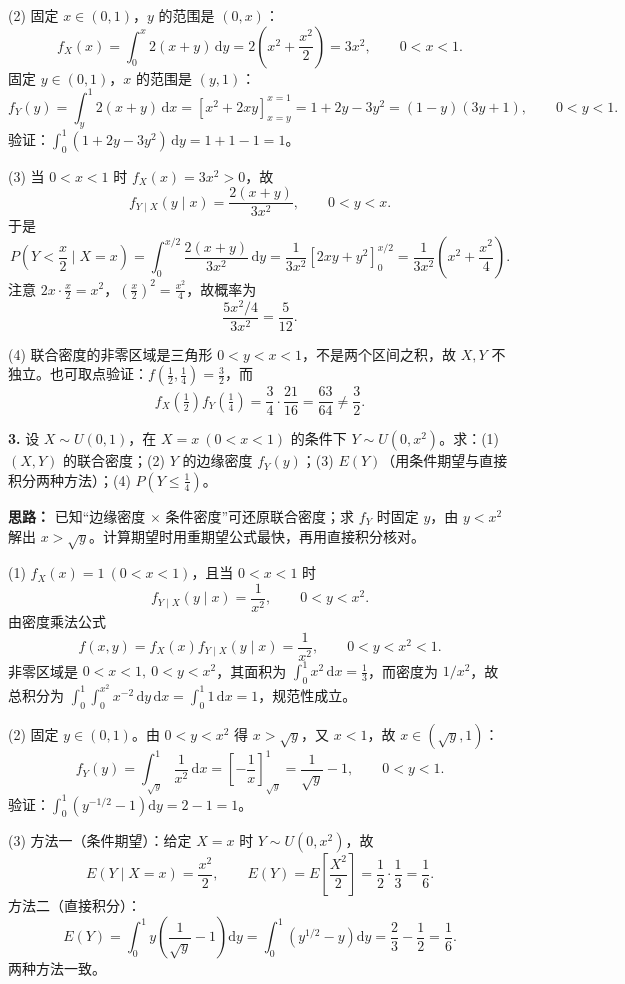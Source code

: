 (2) 固定 $x\in(0,1)$，$y$ 的范围是 $(0,x)$：
\[
f_X(x)=\int_0^x 2(x+y)\,\mathrm dy
=2\left(x^2+\frac{x^2}{2}\right)=3x^2,\qquad 0<x<1.
\]
固定 $y\in(0,1)$，$x$ 的范围是 $(y,1)$：
\[
f_Y(y)=\int_y^1 2(x+y)\,\mathrm dx
=\left[x^2+2xy\right]_{x=y}^{x=1}
=1+2y-3y^2=(1-y)(3y+1),\qquad 0<y<1.
\]
验证：$\int_0^1(1+2y-3y^2)\,\mathrm dy=1+1-1=1$。

(3) 当 $0<x<1$ 时 $f_X(x)=3x^2>0$，故
\[
f_{Y\mid X}(y\mid x)=\frac{2(x+y)}{3x^2},\qquad 0<y<x.
\]
于是
\[
P\!\left(Y<\frac{x}{2}\mid X=x\right)
=\int_0^{x/2}\frac{2(x+y)}{3x^2}\,\mathrm dy
=\frac{1}{3x^2}\left[2xy+y^2\right]_0^{x/2}
=\frac{1}{3x^2}\left(x^2+\frac{x^2}{4}\right).
\]
注意 $2x\cdot\frac{x}{2}=x^2$，$\left(\frac{x}{2}\right)^2=\frac{x^2}{4}$，故概率为
\[
\frac{5x^2/4}{3x^2}=\frac{5}{12}.
\]

(4) 联合密度的非零区域是三角形 $0<y<x<1$，不是两个区间之积，故 $X,Y$ 不独立。也可取点验证：$f(\tfrac12,\tfrac14)=\tfrac32$，而
\[
f_X(\tfrac12)f_Y(\tfrac14)=\frac34\cdot\frac{21}{16}=\frac{63}{64}\neq\frac32.
\]


\else \answerarea[10] \fi%
\textbf{3.} 设 $X\sim U(0,1)$，在 $X=x\ (0<x<1)$ 的条件下 $Y\sim U(0,x^2)$。求：(1) $(X,Y)$ 的联合密度；(2) $Y$ 的边缘密度 $f_Y(y)$；(3) $E(Y)$（用条件期望与直接积分两种方法）；(4) $P(Y\leq \tfrac14)$。

\ifshowsolutions%
\textbf{思路：} 已知“边缘密度 $\times$ 条件密度”可还原联合密度；求 $f_Y$ 时固定 $y$，由 $y<x^2$ 解出 $x>\sqrt y$。计算期望时用重期望公式最快，再用直接积分核对。

(1) $f_X(x)=1\ (0<x<1)$，且当 $0<x<1$ 时
\[
f_{Y\mid X}(y\mid x)=\frac{1}{x^2},\qquad 0<y<x^2.
\]
由密度乘法公式
\[
f(x,y)=f_X(x)f_{Y\mid X}(y\mid x)=\frac{1}{x^2},\qquad 0<y<x^2<1.
\]
非零区域是 $0<x<1,\ 0<y<x^2$，其面积为 $\int_0^1 x^2\,\mathrm dx=\frac13$，而密度为 $1/x^2$，故总积分为 $\int_0^1\int_0^{x^2}x^{-2}\,\mathrm dy\,\mathrm dx=\int_0^1 1\,\mathrm dx=1$，规范性成立。

(2) 固定 $y\in(0,1)$。由 $0<y<x^2$ 得 $x>\sqrt y$，又 $x<1$，故 $x\in(\sqrt y,1)$：
\[
f_Y(y)=\int_{\sqrt y}^{1}\frac{1}{x^2}\,\mathrm dx
=\left[-\frac1x\right]_{\sqrt y}^{1}
=\frac{1}{\sqrt y}-1,\qquad 0<y<1.
\]
验证：$\int_0^1\left(y^{-1/2}-1\right)\mathrm dy=2-1=1$。

(3) 方法一（条件期望）：给定 $X=x$ 时 $Y\sim U(0,x^2)$，故
\[
E(Y\mid X=x)=\frac{x^2}{2},\qquad
E(Y)=E\!\left[\frac{X^2}{2}\right]=\frac{1}{2}\cdot\frac13=\frac16.
\]
方法二（直接积分）：
\[
E(Y)=\int_0^1 y\left(\frac{1}{\sqrt y}-1\right)\mathrm dy
=\int_0^1\left(y^{1/2}-y\right)\mathrm dy
=\frac23-\frac12=\frac16.
\]
两种方法一致。


